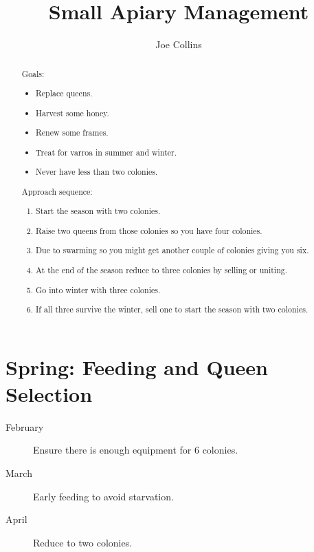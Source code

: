 \documentclass{./BeekeepingBook}
\title{Small Apiary Management}
\author{Joe Collins}
\begin{document}
\maketitle

\begin{abstract}

  Goals:

  \begin{itemize}
    \item Replace queens.
    \item Harvest some honey. 
    \item Renew some frames.
    \item Treat for varroa in summer and winter.
    \item Never have less than two colonies.
  \end{itemize}

  Approach sequence:

  \begin{enumerate}
    \item Start the season with two colonies.
    \item Raise two queens from those colonies so you have four colonies.
    \item Due to swarming so you might get another couple of colonies giving you six.
    \item At the end of the season reduce to three colonies by selling or uniting.
    \item Go into winter with three colonies.
    \item If all three survive the winter, sell one to start the season with two colonies. 
  \end{enumerate}

\end{abstract}

\clearpage
\tableofcontents

\clearpage
\section{Spring: Feeding and Queen Selection}
\begin{description}
  \item[February] Ensure there is enough equipment for 6 colonies.
  \item[March] Early feeding to avoid starvation.
  \item[April] Reduce to two colonies.
\end{description}



\end{document}
